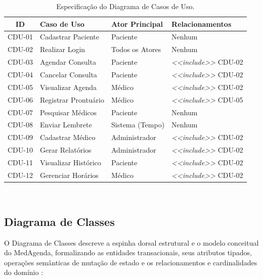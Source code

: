 \begin{table}[htbp]
\centering
\small
\caption{Especificação do Diagrama de Casos de Uso.}
\label{tab:cdu_desc}
\begin{tabularx}{\textwidth}{|c|>{\RaggedRight\arraybackslash}X|l|>{\RaggedRight\arraybackslash}p{4cm}|}
\hline
\textbf{ID} & \textbf{Caso de Uso} & \textbf{Ator Principal} & \textbf{Relacionamentos} \\
\hline
CDU-01 & Cadastrar Paciente & Paciente & Nenhum \\
\hline
CDU-02 & Realizar Login & Todos os Atores & Nenhum \\
\hline
CDU-03 & Agendar Consulta & Paciente & \textit{<<include>>} CDU-02 \\
\hline
CDU-04 & Cancelar Consulta & Paciente & \textit{<<include>>} CDU-02 \\
\hline
CDU-05 & Visualizar Agenda & Médico & \textit{<<include>>} CDU-02 \\
\hline
CDU-06 & Registrar Prontuário & Médico & \textit{<<include>>} CDU-05 \\
\hline
CDU-07 & Pesquisar Médicos & Paciente & Nenhum \\
\hline
CDU-08 & Enviar Lembrete & Sistema (Tempo) & Nenhum \\
\hline
CDU-09 & Cadastrar Médico & Administrador & \textit{<<include>>} CDU-02 \\
\hline
CDU-10 & Gerar Relatórios & Administrador & \textit{<<include>>} CDU-02 \\
\hline
CDU-11 & Visualizar Histórico & Paciente & \textit{<<include>>} CDU-02 \\
\hline
CDU-12 & Gerenciar Horários & Médico & \textit{<<include>>} CDU-02 \\
\hline
\end{tabularx}\\
\autoria
\end{table}

\subsection{Diagrama de Classes}

O Diagrama de Classes descreve a espinha dorsal estrutural e o modelo conceitual do MedAgenda, formalizando as entidades transacionais, seus atributos tipados, operações semânticas de mutação de estado e os relacionamentos e cardinalidades do domínio \cite{larman2004, meyer1997}:

